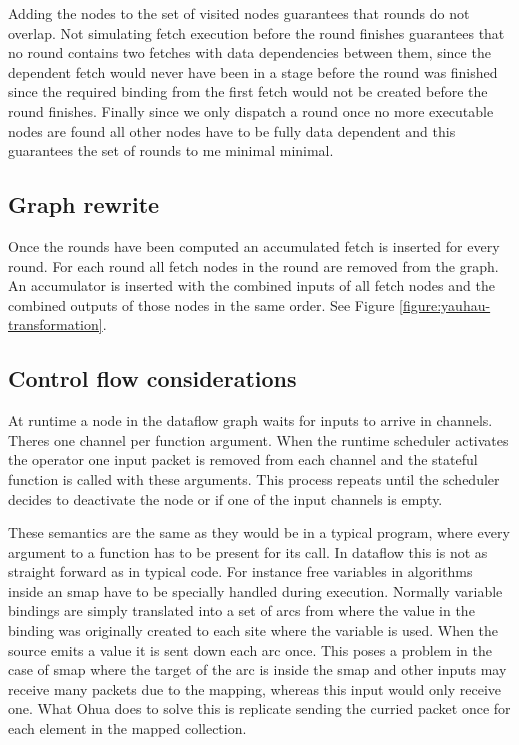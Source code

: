 Adding the \fetch{} nodes to the set of visited nodes guarantees that rounds do not overlap.
Not simulating fetch execution before the round finishes guarantees that no round contains two fetches with data dependencies between them, since the dependent fetch would never have been in a stage before the round was finished since the required binding from the first fetch would not be created before the round finishes.
Finally since we only dispatch a round once no more executable nodes are found all other nodes have to be fully data dependent and this guarantees the set of rounds to me minimal minimal.

\subsection{Graph rewrite}

Once the rounds have been computed an accumulated fetch is inserted for every round.
For each round all fetch nodes in the round are removed from the graph.
An accumulator is inserted with the combined inputs of all fetch nodes and the combined outputs of those nodes in the same order. See Figure \ref{figure:yauhau-transformation}.

\subsection{Control flow considerations}

At runtime a node in the dataflow graph waits for inputs to arrive in channels.
Theres one channel per function argument.
When the runtime scheduler activates the operator one input packet is removed from each channel and the stateful function is called with these arguments.
This process repeats until the scheduler decides to deactivate the node or if one of the input channels is empty.

These semantics are the same as they would be in a typical program, where every argument to a function has to be present for its call.
In dataflow this is not as straight forward as in typical code.
For instance free variables in algorithms inside an smap have to be specially handled during execution.
Normally variable bindings are simply translated into a set of arcs from where the value in the binding was originally created to each site where the variable is used.
When the source emits a value it is sent down each arc once.
This poses a problem in the case of smap where the target of the arc is inside the smap and other inputs may receive many packets due to the mapping, whereas this input would only receive one.
What Ohua does to solve this is replicate sending the curried packet once for each element in the mapped collection.

